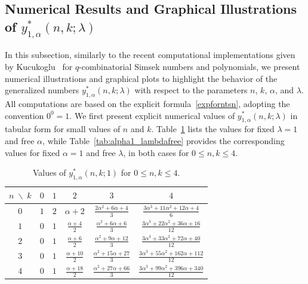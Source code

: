 \documentclass{amsart}
\numberwithin{equation}{section}
\theoremstyle{definition}
\theoremstyle{remark}
\begin{document}
\subsection{Numerical Results and Graphical Illustrations of $y_{1, \alpha}^{*}(n,k;\lambda)$}
In this subsection, similarly to the recent computational implementations given by Kucukoglu~\cite{IK2025} for $q$-combinatorial Simsek numbers and polynomials, we present numerical illustrations and graphical  plots to highlight the behavior of the generalized numbers
$y_{1,\alpha}^{*}(n,k;\lambda)$ with respect to the parameters
$n$, $k$, $\alpha$, and $\lambda$.
All computations are based on the explicit formula~\eqref{expforntsn}, adopting the convention $0^0=1$.
\medskip
We first  present explicit numerical values of $y_{1,\alpha}^{*}(n,k;\lambda)$ in tabular form for small values of
$n$ and $k$. Table~\ref{tab:alphafree_lambda1} lists the values for fixed $\lambda=1$ and
free $\alpha$, while Table~\ref{tab:alpha1_lambdafree} provides the
corresponding values for fixed $\alpha=1$ and free $\lambda$, in both cases for
$0 \leq n,k \leq 4$.
\begin{table}[h]
\centering
\setlength{\tabcolsep}{12pt} %
\renewcommand{\arraystretch}{1.5} %
\begin{tabular}{|c|ccccc|}
\hline
$n \;\backslash\; k$ & $0$ & $1$ & $2$ & $3$ & $4$ \\
\hline
$0$ &
$1$ &
$2$ &
$\alpha + 2$ &
$\frac{2\alpha^{2} + 6\alpha + 4}{3}$ &
$\frac{3\alpha^{3} + 11\alpha^{2} + 12\alpha + 4}{6}$ \\

$1$ &
$0$ &
$1$ &
$\frac{\alpha + 4}{2}$ &
$\frac{\alpha^{2} + 6\alpha + 6}{3}$ &
$\frac{3\alpha^{3} + 22\alpha^{2} + 36\alpha + 16}{12}$ \\

$2$ &
$0$ &
$1$ &
$\frac{\alpha + 6}{2}$ &
$\frac{\alpha^{2} + 9\alpha + 12}{3}$ &
$\frac{3\alpha^{3} + 33\alpha^{2} + 72\alpha + 40}{12}$ \\

$3$ &
$0$ &
$1$ &
$\frac{\alpha + 10}{2}$ &
$\frac{\alpha^{2} + 15\alpha + 27}{3}$ &
$\frac{3\alpha^{3} + 55\alpha^{2} + 162\alpha + 112}{12}$ \\

$4$ &
$0$ &
$1$ &
$\frac{\alpha + 18}{2}$ &
$\frac{\alpha^{2} + 27\alpha + 66}{3}$ &
$\frac{3\alpha^{3} + 99\alpha^{2} + 396\alpha + 340}{12}$ \\
\hline
\end{tabular}
\caption{Values of $y_{1,\alpha}^{*}(n,k;1)$ for $0\leq n, k\leq 4$.}
\label{tab:alphafree_lambda1}
\end{table}
\end{document}
